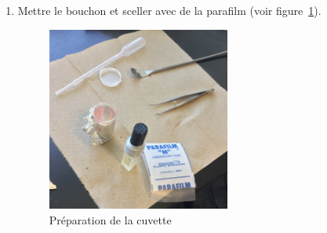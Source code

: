\begin{enumerate}
    \item Mettre le bouchon et sceller avec de la parafilm (voir figure~\ref{fig:parafilm}).
        \begin{figure}[H]
        \centering
        \includegraphics[width=6cm]{parafilm.jpg}
        \caption{Préparation de la cuvette}
        \label{fig:parafilm}
        \end{figure}
\end{enumerate}